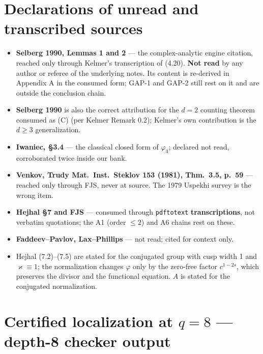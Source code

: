\documentclass[11pt]{amsart}
\theoremstyle{remark}
\begin{document}

\section{Declarations of unread and transcribed sources}
\label{sec:unread}

\begin{itemize}
\item \textbf{Selberg 1990, Lemmas 1 and 2} --- the complex-analytic
engine citation, reached only through Kelmer's transcription of (4.20).
\textbf{Not read} by any author or referee of the underlying notes. Its
content is re-derived in Appendix A in the consumed form; GAP-1 and
GAP-2 still rest on it and are outside the conclusion chain.
\item \textbf{Selberg 1990} is also the correct attribution for the
$d=2$ counting theorem consumed as (C) (per Kelmer Remark 0.2); Kelmer's
own contribution is the $d\ge3$ generalization.
\item \textbf{Iwaniec, \S3.4} --- the classical closed form of
$\varphi_3$; declared not read, corroborated twice inside our bank.
\item \textbf{Venkov, Trudy Mat.\ Inst.\ Steklov 153 (1981), Thm.\ 3.5,
p.\ 59} --- reached only through FJS, never at source. The 1979 Uspekhi
survey is the wrong item.
\item \textbf{Hejhal \S7 and FJS} --- consumed through \texttt{pdftotext}
\textbf{transcriptions}, not verbatim quotations; the A1 (order $\le2$)
and A6 chains rest on these.
\item \textbf{Faddeev--Pavlov, Lax--Phillips} --- not read; cited for
context only.
\item Hejhal (7.2)--(7.5) are stated for the conjugated group with cusp
width 1 and $\varkappa\equiv1$; the normalization changes $\varphi$ only
by the zero-free factor $c^{1-2s}$, which preserves the divisor and the
functional equation. $A$ is stated for the conjugated normalization.
\end{itemize}

\section{Certified localization at $q=8$ --- depth-8 checker output}
\label{sec:q8}
\end{document}
